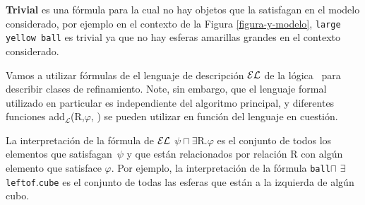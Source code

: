\textbf{Trivial} es una f\'ormula para la cual no hay objetos que la satisfagan en el modelo considerado, por ejemplo en el contexto de la 
Figura \ref{figura-y-modelo}, \texttt{large yellow ball} es trivial ya que no hay esferas amarillas grandes en el contexto considerado.

Vamos a utilizar f\'ormulas de el lenguaje de descripci\'on $\mathcal{EL}$ de la l\'ogica~\cite{baader03} para describir clases de refinamiento.
Note, sin embargo, que el lenguaje formal utilizado en particular es independiente del algoritmo principal, y diferentes 
funciones add$_{\mathcal {L}}$(R,$\varphi $, \RE) se pueden utilizar en funci\'on del lenguaje en cuesti\'on.

La interpretaci\'on de la f\'ormula de $\mathcal{EL}$  $\psi \sqcap \exists $R.$ \varphi$ es el conjunto de todos los elementos que 
satisfagan~$\psi$ y que est\'an relacionados por relaci\'on R con alg\'un elemento que satisface $\varphi $.
Por ejemplo, la interpretaci\'on de la f\'ormula \texttt{ball}$\sqcap$ $\exists$ \texttt{leftof}.\texttt{cube} es el conjunto de todas las esferas 
que est\'an a la izquierda de alg\'un cubo.

